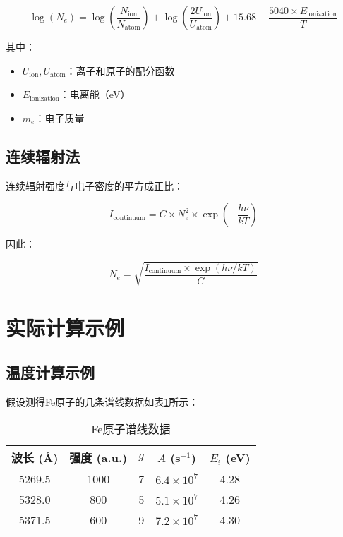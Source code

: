 \documentclass[12pt,a4paper]{article}
\begin{document}
\begin{equation}
\boxed{\log(N_e) = \log\left(\frac{N_{\text{ion}}}{N_{\text{atom}}}\right) + \log\left(\frac{2U_{\text{ion}}}{U_{\text{atom}}}\right) + 15.68 - \frac{5040 \times E_{\text{ionization}}}{T}}
\end{equation}

其中：
\begin{itemize}
    \item $U_{\text{ion}}, U_{\text{atom}}$：离子和原子的配分函数
    \item $E_{\text{ionization}}$：电离能（eV）
    \item $m_e$：电子质量
\end{itemize}

\subsection{连续辐射法}

连续辐射强度与电子密度的平方成正比：

\begin{equation}
I_{\text{continuum}} = C \times N_e^2 \times \exp\left(-\frac{h\nu}{kT}\right)
\end{equation}

因此：

\begin{equation}
\boxed{N_e = \sqrt{\frac{I_{\text{continuum}} \times \exp(h\nu/kT)}{C}}}
\end{equation}

\section{实际计算示例}

\subsection{温度计算示例}

假设测得Fe原子的几条谱线数据如表\ref{tab:fe_lines}所示：

\begin{table}[h]
\centering
\caption{Fe原子谱线数据}
\label{tab:fe_lines}
\begin{tabular}{@{}ccccc@{}}
\toprule
波长 (Å) & 强度 (a.u.) & $g$ & $A$ (s$^{-1}$) & $E_i$ (eV) \\
\midrule
5269.5 & 1000 & 7 & $6.4 \times 10^7$ & 4.28 \\
5328.0 & 800 & 5 & $5.1 \times 10^7$ & 4.26 \\
5371.5 & 600 & 9 & $7.2 \times 10^7$ & 4.30 \\
\bottomrule
\end{tabular}
\end{table}
\end{document}
